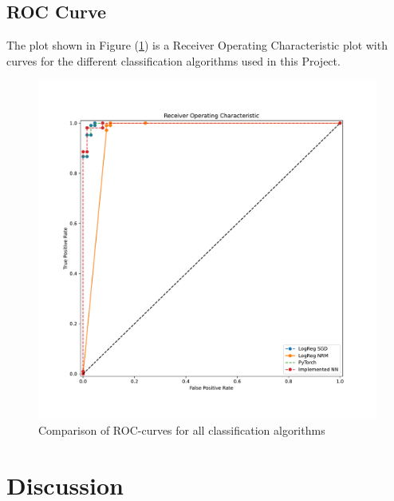 \documentclass
[twocolumn,
secnumarabic,
nobibnotes,
aps,
prl,
reprint,
groupedaddress,
amsmath,
amssymb
]{revtex4-2}
\begin{document}
\subsection{ROC Curve}
The plot shown in Figure (\ref{fig:EX_E_roc_curve}) is a Receiver Operating Characteristic plot with curves for the different classification algorithms used in this Project.
\begin{figure}
  \includegraphics[width=\columnwidth]{figures/EX_E_roc_curve.pdf}
  \caption{\label{fig:EX_E_roc_curve}Comparison of ROC-curves for all classification algorithms}
\end{figure}


\section{Discussion}
\end{document}
